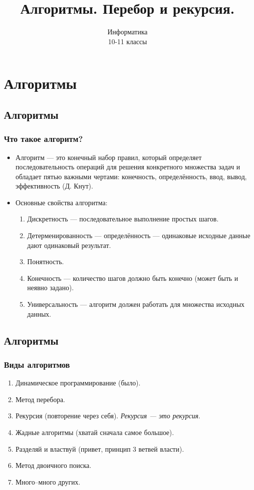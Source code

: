 \documentclass[compress,red]{beamer}
\title{Алгоритмы. Перебор и рекурсия.}
\author{Информатика \\ 10-11 классы}
\begin{document}
\maketitle

\section{Алгоритмы}
\subsection{Алгоритмы}
\begin{frame}[fragile]
\frametitle{Что такое алгоритм?}
		\begin{itemize}
		\item Алгоритм — это конечный набор правил, который определяет последовательность операций для решения конкретного множества задач и обладает пятью важными чертами: конечность, определённость, ввод, вывод, эффективность (Д. Кнут).
		\item Основные свойства алгоритма:
		  \begin{enumerate}
		    \item Дискретность --- последовательное выполнение простых шагов.
		    \item Детерменированность  --- определённость --- одинаковые исходные данные дают одинаковый результат.
		    \item Понятность.
		    \item Конечность --- количество шагов должно быть конечно (может быть и неявно задано).
		    \item Универсальность --- алгоритм должен работать для множества исходных данных.
		  \end{enumerate}
		\end{itemize}
\end{frame}

\subsection{Алгоритмы}
\begin{frame}[fragile]
\frametitle{Виды алгоритмов}
  \begin{enumerate}
    \item Динамическое программирование (было).
    \item Метод перебора.
    \item Рекурсия (повторение через себя). \emph{Рекурсия --- это рекурсия}.
    \item Жадные алгоритмы (хватай сначала самое большое).
    \item Разделяй и властвуй (привет, принцип 3 ветвей власти).
    \item Метод двоичного поиска.
    \item Много--много других.
  \end{enumerate}
\end{frame}
\end{document}
